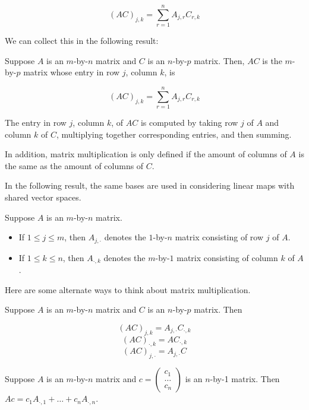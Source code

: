 \[ (AC)_{j,k} = \sum_{r=1}^n A_{j,r} C_{r,k} \]

We can collect this in the following result:

\begin{definition}
   Suppose $A$ is an $m$-by-$n$ matrix and $C$ is an $n$-by-$p$ matrix.
   Then, $AC$ is the $m$-by-$p$ matrix whose entry in row $j$, column
   $k$, is

   \[ (AC)_{j,k} = \sum_{r=1}^n A_{j,r} C_{r,k} \]
\end{definition}

The entry in row $j$, column $k$, of $AC$ is computed
by taking row $j$ of $A$ and column $k$ of $C$, multiplying
together corresponding entries, and then summing.

In addition, matrix multiplication is only defined if
the amount of columns of $A$ is the same as the amount
of columns of $C$.

In the following result, the same bases are used in considering
linear maps with shared vector spaces.

\begin{definition}
   Suppose $A$ is an $m$-by-$n$ matrix.
   \begin{itemize}
      \item If $1 \leq j \leq m$, then $A_{j, \cdot}$ denotes
      the $1$-by-$n$ matrix consisting of row $j$ of $A$.
      \item If $1 \leq k \leq n$, then $A_{\cdot, k}$ denotes
      the $m$-by-$1$ matrix consisting of column $k$ of $A$.
   \end{itemize}
\end{definition}

Here are some alternate ways to think about matrix multiplication.

\begin{theorem} 
   Suppose $A$ is an $m$-by-$n$ matrix and $C$ is an $n$-by-$p$ matrix. Then

   \[ (AC)_{j,k} = A_{j, \cdot} C_{\cdot, k} \]
   \[ (AC)_{\cdot, k} = AC_{\cdot, k} \]
   \[ (AC)_{j, \cdot} = A_{j, \cdot} C \]
\end{theorem}

\begin{theorem} 
   Suppose $A$ is an $m$-by-$n$ matrix and $c = \begin{pmatrix*} c_1 \\ \dots \\ c_n \end{pmatrix*}$
   is an $n$-by-1 matrix. Then $Ac = c_1 A_{\cdot, 1} + \dots + c_n A_{\cdot, n}$.
\end{theorem}

